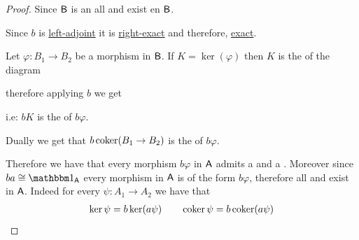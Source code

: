 \documentclass[../main.tex]{subfiles}
\begin{document}
\begin{proof}
  Since \(\mathsf{B}\) is an  all  and  exist en \(\mathsf{B}\).

  Since \(b\) is \hyperref[def:adjunction]{left-adjoint} it is \hyperref[def:exact-complex-functor]{right-exact} and therefore, \hyperref[def:exact-complex-functor]{exact}.

  Let \(\varphi: B_{1} \to B_{2}\) be a morphism in \(\mathsf{B}\).
  If \(K = \ker(\varphi)\) then \(K\) is the  of the diagram
  \begin{center}
  \end{center}
  therefore applying \(b\) we get
  \begin{center}
  \end{center}
  i.e: \(bK\) is the  of \(b\varphi\).

  Dually we get that \(b\operatorname*{coker}(B_{1} \to B_{2})\) is the  of \(b\varphi\).

  Therefore we have that every morphism \(b\varphi\) in \(\mathsf{A}\) admits a  and a .
  Moreover since \(ba \cong \id_{\category{A}}\) every morphism in \(\mathsf{A}\) is of the form \(b\varphi\), therefore all  and  exist in \(\mathsf{A}\).
  Indeed for every \(\psi: A_{1} \to A_{2}\) we have that
  \begin{align} \label{eq:ker-coker-lemma}
    \ker \psi = b\ker(a\psi) \qquad \operatorname*{coker} \psi = b\operatorname*{coker}(a\psi)
  \end{align}


\end{proof}
\end{document}
